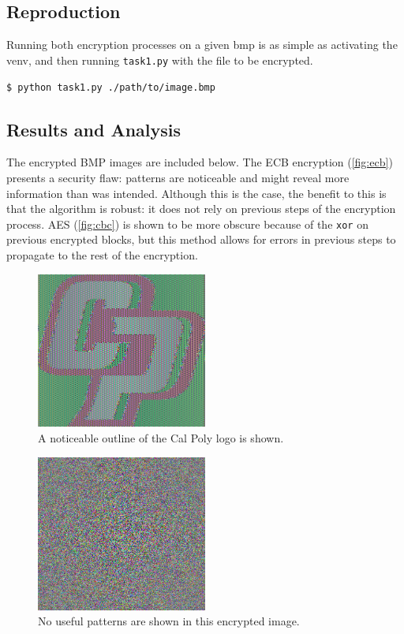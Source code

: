 \documentclass[11pt]{article}
\begin{document}
\subsection*{Reproduction}

Running both encryption processes on a given bmp is as simple as activating the venv, and then running \verb|task1.py| with the file to be encrypted.

\verb|$ python task1.py ./path/to/image.bmp|

\subsection*{Results and Analysis}

The encrypted BMP images are included below. The ECB encryption (\autoref{fig:ecb}) presents a security flaw: patterns are noticeable and might reveal more information than was intended. Although this is the case, the benefit to this is that the algorithm is robust: it does not rely on previous steps of the encryption process. AES (\autoref{fig:cbc}) is shown to be more obscure because of the \verb|xor| on previous encrypted blocks, but this method allows for errors in previous steps to propagate to the rest of the encryption.

\begin{figure}[!ht]
	\centering
	\includegraphics[width=0.5\textwidth]{./assets/ecb_encrypted.jpg}
	\caption{A noticeable outline of the Cal Poly logo is shown.}
	\label{fig:ecb}
\end{figure}

\begin{figure}[!ht]
	\centering
	\includegraphics[width=0.5\textwidth]{./assets/cbc_encrypted.jpg}
	\caption{No useful patterns are shown in this encrypted image.}
	\label{fig:cbc}
\end{figure}
\end{document}
